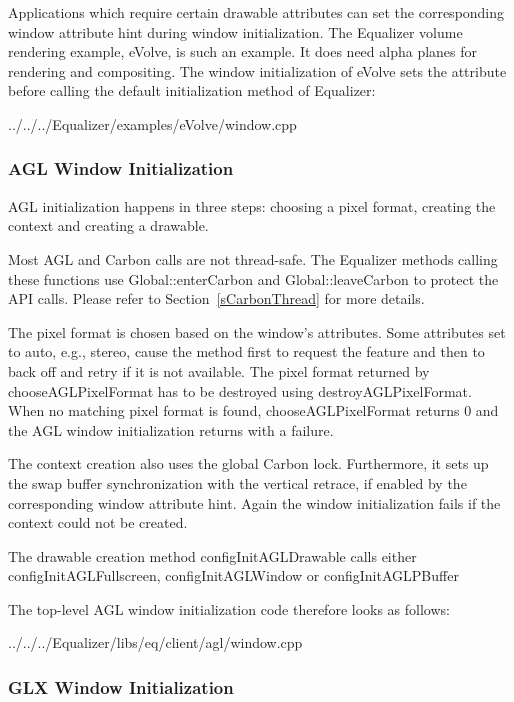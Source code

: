 \documentclass[10pt,a4]{scrartcl}
\newcommand{\sref}[1]{Section~\ref{#1}}
\begin{document}
Applications which require certain drawable attributes can set the
corresponding window attribute hint during window initialization. The
Equalizer volume rendering example, \textsf{eVolve}, is such an
example. It does need alpha planes for rendering and compositing. The
window initialization of \textsf{eVolve} sets the attribute before
calling the default initialization method of Equalizer:

{\footnotesize
  {../../../Equalizer/examples/eVolve/window.cpp}}


\subsubsection{AGL Window Initialization}

AGL initialization happens in three steps: choosing a pixel format,
creating the context and creating a drawable. 

Most AGL and Carbon calls are not thread-safe. The Equalizer methods
calling these functions use \textsf{Global::enterCarbon} and
\textsf{Global::leaveCarbon} to protect the API calls. Please refer to
\sref{sCarbonThread} for more details.

The pixel format is chosen based on the window's attributes. Some
attributes set to auto, e.g., stereo, cause the method first to request
the feature and then to back off and retry if it is not available. The
pixel format returned by \textsf{chooseAGLPixelFormat} has to be
destroyed using \textsf{destroyAGLPixelFormat}. When no matching pixel
format is found, \textsf{chooseAGLPixelFormat} returns \textsf{0} and
the AGL window initialization returns with a failure.

The context creation also uses the global Carbon lock. Furthermore, it
sets up the swap buffer synchronization with the vertical retrace, if
enabled by the corresponding window attribute hint. Again the window
initialization fails if the context could not be created.

The drawable creation method \textsf{configInitAGLDrawable} calls either
\textsf{configInitAGLFullscreen}, \textsf{configInitAGLWindow} or \textsf{configInitAGLPBuffer}

The top-level AGL window initialization code therefore looks as follows:

{\footnotesize
  {../../../Equalizer/libs/eq/client/agl/window.cpp}}


\subsubsection{GLX Window Initialization}
\end{document}
